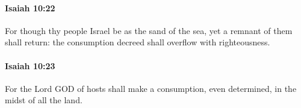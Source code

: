 		\paragraph{Isaiah 10:22} %
			\label{ISAIAH-10-22}

			For though thy people Israel be as the sand of the sea, yet a remnant of them shall return: the consumption decreed shall overflow with righteousness.


		\paragraph{Isaiah 10:23} %
			\label{ISAIAH-10-23}

			For the Lord GOD of hosts shall make a consumption, even determined, in the midst of all the land.


